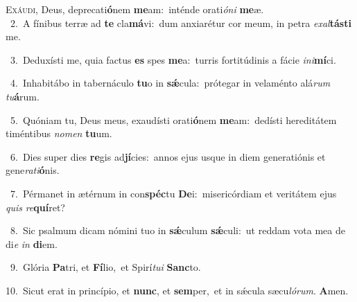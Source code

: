 \lettrine{\initial\textcolor{\initialcolor}{E}}{xáudi,} Deus, deprecati\-\textbf{ó}\-nem \textbf{me}\-am:~\star inténde orati\-\textit{ó}\-\textit{ni} \textbf{me}\-æ.\\
{\numbfont\textcolor{\numbcolor}{~2.}}~A fínibus terræ ad \textbf{te} cla\-\textbf{má}\-vi:~\star dum anxiarétur cor meum, in petra \textit{ex}\-\textit{al}\textbf{tás}\textbf{ti} me.\par
{\numbfont\textcolor{\numbcolor}{~3.}}~Deduxísti me, quia factus \textbf{es} spes \textbf{me}\-a:~\star turris fortitúdinis a fácie \textit{in}\-\textit{i}\textbf{mí}ci.\par
{\numbfont\textcolor{\numbcolor}{~4.}}~Inhabitábo in tabernáculo \textbf{tu}\-o in \textbf{sǽ}\-cula:~\star prótegar in velaménto alá\textit{rum} \textit{tu}\-\textbf{á}rum.\par
{\numbfont\textcolor{\numbcolor}{~5.}}~Quóniam tu, Deus meus, exaudísti orati\-\textbf{ó}\-nem \textbf{me}\-am:~\star dedísti hereditátem timéntibus \textit{no}\-\textit{men} \textbf{tu}\-um.\par
{\numbfont\textcolor{\numbcolor}{~6.}}~Dies super dies \textbf{re}\-gis ad\-\textbf{jí}\-cies:~\star annos ejus usque in diem generatiónis et gene\-\textit{ra}\-\textit{ti}\textbf{ó}nis.\par
{\numbfont\textcolor{\numbcolor}{~7.}}~Pérmanet in ætérnum in con\-\textbf{spéc}\-tu \textbf{De}\-i:~\star misericórdiam et veritátem ejus \textit{quis} \textit{re}\-\textbf{quí}ret?\par
{\numbfont\textcolor{\numbcolor}{~8.}}~Sic psalmum dicam nómini tuo in \textbf{sǽ}\-culum \textbf{sǽ}\-culi:~\star ut reddam vota mea de di\textit{e} \textit{in} \textbf{di}\-em.\par
{\numbfont\textcolor{\numbcolor}{~9.}}~Glória \textbf{Pa}\-tri, et \textbf{Fí}\-lio,~\star et Spirí\-\textit{tu}\-\textit{i} \textbf{Sanc}\-to.\par
{\numbfont\textcolor{\numbcolor}{10.}}~Sicut erat in princípio, et \textbf{nunc}\-, et \textbf{sem}\-per,~\star et in sǽcula sæcu\-\textit{ló}\-\textit{rum}. \textbf{A}\-men.\par
